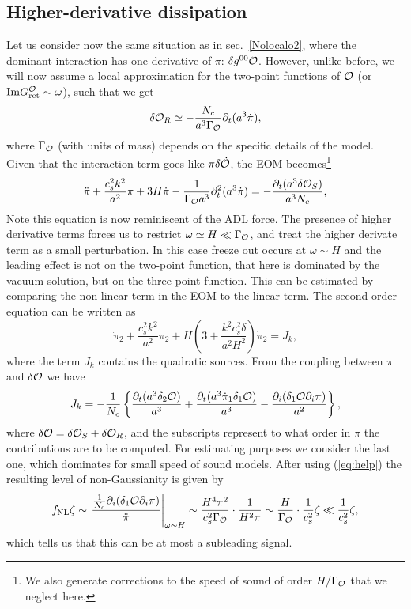 \documentclass[11pt,amsmath,floats,floatfix,nofootinbib,secnumarabic, superscriptaddress, tightenlines]{revtex4}
\newcommand{\beq}{\begin{equation}}
\newcommand{\eeq}{\end{equation}}
\newcommand{\be}{\begin{equation}}
\newcommand{\ee}{\end{equation}}
\newcommand{\lp}{\left(}
\newcommand{\rp}{\right)}
\newcommand{\calo}{{\cal O}}
\begin{document}
{\subsection{Higher-derivative dissipation}\label{localo2}

Let us consider now the same situation as in sec.~\ref{Nolocalo2}, where the dominant interaction has one derivative of $\pi$: $\delta g^{00}\calo$. However, unlike before, we will now assume a local approximation for the two-point functions of $\calo$ (or ${\rm Im}G_{\rm ret}^\calo \sim \omega$), such that we get
\beq\label{eq:help}\delta\calo_R\simeq-\frac{N_c}{a^3\Gamma_\calo}\partial_t(a^3\dot{\pi}),\ee
where $\Gamma_\calo$ (with units of mass) depends on the specific details of the model. Given that the interaction term goes like $\pi\delta\dot\calo$, the EOM
becomes\footnote{We also generate corrections to the speed of sound of order $H/\Gamma_\calo$ that we neglect here.}
\beq \ddot{\pi}+\frac{c_s^2k^2}{a^2}\pi+3H\dot\pi- \frac{1}{\Gamma_\calo a^3}\partial_t^2(a^3\dot\pi)=-\frac{\partial_t(a^3\delta\calo_S)}{a^3N_c},\eeq
Note this equation is now reminiscent of the ADL force. The presence of higher derivative terms forces us to restrict $\omega \simeq H \ll \Gamma_\calo$,
and treat the higher derivate term as a small perturbation. In this case freeze out occurs at $\omega \sim H$ and the leading effect is not on the two-point
function, that here is dominated by the vacuum solution, but on the three-point function. This can be estimated by comparing the non-linear term in the EOM to the linear term. The second order equation can be written as
\be\ddot{\pi}_2+\frac{{c}_s^2k^2}{a^2}\pi_2+H\lp3+\frac{ k^2c_s^2 \delta}{a^2H^2}\rp\dot{\pi}_2=J_k,\ee
where the term $J_k$ contains the quadratic sources. From the  coupling between $\pi$ and $\delta \calo$ we have
\be \label{source}J_k=-\frac{1}{N_c}\left\{\frac{\partial_t(a^3{\delta}_2\calo)}{a^3}+\frac{\partial_t(a^3\dot{\pi}_1{\delta}_1\calo)}{a^3}-\frac{\partial_i({\delta}_1\calo\partial_i\pi)}{a^2}\right\},\ee
where ${\delta}\calo=\delta\calo_S+\delta\calo_R$, and the subscripts represent to what order in $\pi$ the contributions are to be computed. For estimating purposes we consider the last one, which dominates for small speed of sound models. 
After using (\ref{eq:help}) the resulting level of non-Gaussianity is given by
\be
f_{\rm NL}\zeta\sim\left.\frac{\frac{1}{N_c}\partial_i({\delta}_1\calo\partial_i\pi)}{\ddot\pi}\right|_{\omega\sim H}\sim\frac{H^4 \pi^2}{c_s^2 \Gamma_\calo}\cdot \frac{1}{ H^2\pi}\sim\frac{H}{\Gamma_\calo}\cdot\frac{1}{c_s^2}\zeta\ll \frac{1}{c_s^2}\zeta,
\ee
which tells us that this can be at most a subleading signal.




}
\end{document}

